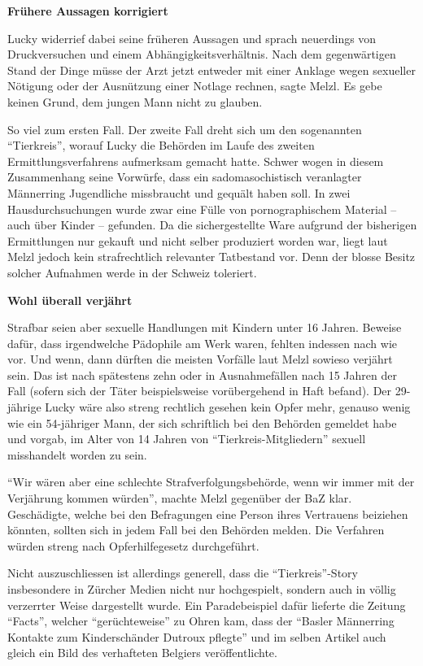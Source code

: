 \textbf{Frühere Aussagen korrigiert}

Lucky widerrief dabei seine früheren Aussagen und sprach neuerdings von
Druckversuchen und einem Abhängigkeitsverhältnis. Nach dem gegenwärtigen
Stand der Dinge müsse der Arzt jetzt entweder mit einer Anklage wegen
sexueller Nötigung oder der Ausnützung einer Notlage rechnen, sagte
Melzl. Es gebe keinen Grund, dem jungen Mann nicht zu glauben.

So viel zum ersten Fall. Der zweite Fall dreht sich um den sogenannten
``Tierkreis'', worauf Lucky die Behörden im Laufe des zweiten
Ermittlungsverfahrens aufmerksam gemacht hatte. Schwer wogen in diesem
Zusammenhang seine Vorwürfe, dass ein sadomasochistisch veranlagter
Männerring Jugendliche missbraucht und gequält haben soll. In zwei
Hausdurchsuchungen wurde zwar eine Fülle von porno­gra­phi­schem
Material -- auch über Kinder -- gefunden. Da die sichergestellte Ware
aufgrund der bisherigen Ermittlungen nur gekauft und nicht selber
produziert worden war, liegt laut Melzl jedoch kein strafrechtlich
relevanter Tatbestand vor. Denn der blosse Besitz solcher Aufnahmen
werde in der Schweiz toleriert.

\textbf{Wohl überall verjährt}

Strafbar seien aber sexuelle Handlungen mit Kindern unter 16 Jahren.
Beweise dafür, dass irgendwelche Pädophile am Werk waren, fehlten
indessen nach wie vor. Und wenn, dann dürften die meisten Vorfälle laut
Melzl sowieso verjährt sein. Das ist nach spätestens zehn oder in
Ausnahmefällen nach 15 Jahren der Fall (sofern sich der Täter
beispielsweise vorübergehend in Haft befand). Der 29-jährige Lucky wäre
also streng rechtlich gesehen kein Opfer mehr, genauso wenig wie ein
54-jähriger Mann, der sich schriftlich bei den Behörden gemeldet habe
und vorgab, im Alter von 14 Jahren von ``Tierkreis-Mitgliedern'' sexuell
misshandelt worden zu sein.

``Wir wären aber eine schlechte Strafverfolgungsbehörde, wenn wir immer
mit der Verjährung kommen würden'', machte Melzl gegenüber der BaZ klar.
Geschädigte, welche bei den Befragungen eine Person ihres Vertrauens
beiziehen könnten, sollten sich in jedem Fall bei den Behörden melden.
Die Verfahren würden streng nach Opferhilfegesetz durchgeführt.

Nicht auszuschliessen ist allerdings generell, dass die
``Tierkreis''-Story insbesondere in Zürcher Medien nicht nur
hochgespielt, sondern auch in völlig verzerrter Weise dargestellt wurde.
Ein Paradebeispiel dafür lieferte die Zeitung ``Facts'', welcher
``gerüchteweise'' zu Ohren kam, dass der ``Basler Männerring Kontakte
zum Kinderschänder Dutroux pflegte'' und im selben Artikel auch gleich
ein Bild des verhafteten Belgiers veröffentlichte.

